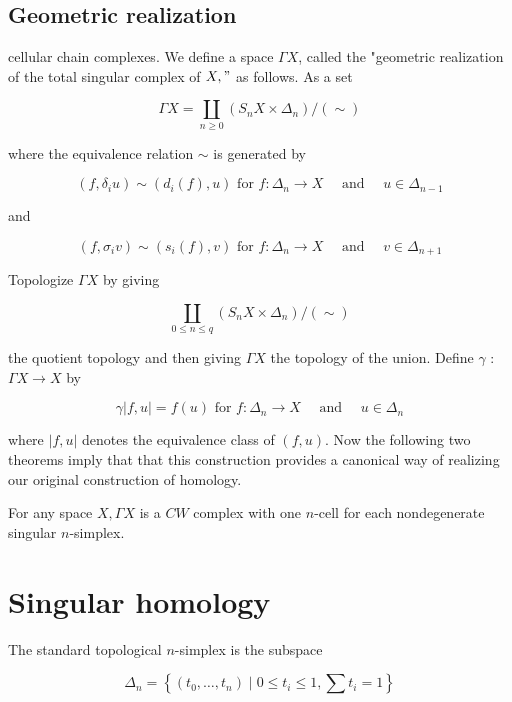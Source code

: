 \subsection*{Geometric realization}

cellular chain complexes. We define a space $\Gamma X$, called the "geometric realization of the total singular complex of $X, "$ as follows. As a set

$$
\Gamma X=\coprod_{n \geq 0}\left(S_n X \times \Delta_n\right) /(\sim)
$$

where the equivalence relation $\sim$ is generated by

$$
\left(f, \delta_i u\right) \sim\left(d_i(f), u\right) \text { for } f: \Delta_n \longrightarrow X \quad \text { and } \quad u \in \Delta_{n-1}
$$

and

$$
\left(f, \sigma_i v\right) \sim\left(s_i(f), v\right) \text { for } f: \Delta_n \longrightarrow X \quad \text { and } \quad v \in \Delta_{n+1}
$$


Topologize $\Gamma X$ by giving

$$
\coprod_{0 \leq n \leq q}\left(S_n X \times \Delta_n\right) /(\sim)
$$

the quotient topology and then giving $\Gamma X$ the topology of the union. Define $\gamma$ : $\Gamma X \longrightarrow X$ by

$$
\gamma|f, u|=f(u) \text { for } f: \Delta_n \longrightarrow X \quad \text { and } \quad u \in \Delta_n
$$

where $|f, u|$ denotes the equivalence class of $(f, u)$. Now the following two theorems imply that that this construction provides a canonical way of realizing our original construction of homology.

\begin{theo}
    For any space $X, \Gamma X$ is a $C W$ complex with one $n$-cell for each nondegenerate singular $n$-simplex.
\end{theo}







\section{Singular homology}

The standard topological $n$-simplex is the subspace

$$
\Delta_n=\left\{\left(t_0, \ldots, t_n\right) \mid 0 \leq t_i \leq 1, \sum t_i=1\right\}
$$

